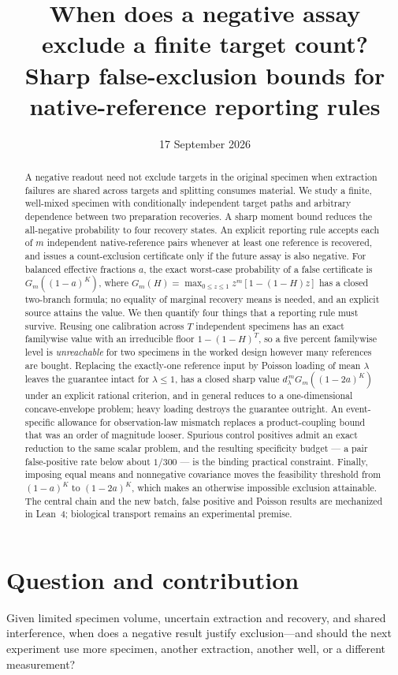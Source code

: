 \documentclass[11pt]{article}
\title{When does a negative assay exclude a finite target count?\\[4pt]
\large Sharp false-exclusion bounds for native-reference reporting rules}
\author{}
\date{17 September 2026}
\theoremstyle{remark}\newtheorem{remark}[theorem]{Remark}
\begin{document}
\maketitle
\vspace{-1.8em}
\begin{abstract}
A negative readout need not exclude targets in the original specimen when
extraction failures are shared across targets and splitting consumes material.
We study a finite, well-mixed specimen with conditionally independent target
paths and arbitrary dependence between two preparation recoveries. A sharp
moment bound reduces the all-negative probability to four recovery states. An
explicit reporting rule accepts each of $m$ independent native-reference pairs
whenever at least one reference is recovered, and issues a count-exclusion
certificate only if the future assay is also negative. For balanced effective
fractions $a$, the exact worst-case probability of a false certificate is
$G_m((1-a)^K)$, where $G_m(H)=\max_{0\le z\le1}z^m[1-(1-H)z]$ has a closed
two-branch formula; no equality of marginal recovery means is needed, and an
explicit source attains the value. We then quantify four things that a reporting
rule must survive. Reusing one calibration across $T$ independent specimens has
an exact familywise value with an irreducible floor $1-(1-H)^T$, so a five
percent familywise level is \emph{unreachable} for two specimens in the worked
design however many references are bought. Replacing the exactly-one reference
input by Poisson loading of mean $\lambda$ leaves the guarantee intact for
$\lambda\le1$, has a closed sharp value $d_\lambda^{\,m}G_m((1-2a)^K)$ under an
explicit rational criterion, and in general reduces to a one-dimensional
concave-envelope problem; heavy loading destroys the guarantee outright. An event-specific
allowance for observation-law mismatch replaces a product-coupling bound that
was an order of magnitude looser. Spurious control positives admit an exact
reduction to the same scalar problem, and the resulting specificity budget --- a
pair false-positive rate below about $1/300$ --- is the binding practical
constraint. Finally, imposing equal means and nonnegative covariance moves the
feasibility threshold from $(1-a)^K$ to $(1-2a)^K$, which makes an otherwise
impossible exclusion attainable. The central chain and the new batch, false
positive and Poisson results are mechanized in Lean~4; biological transport
remains an experimental premise.
\end{abstract}

\section{Question and contribution}\label{sec:intro}
Given limited specimen volume, uncertain extraction and recovery, and shared
interference, when does a negative result justify exclusion---and should the next
experiment use more specimen, another extraction, another well, or a different
measurement?
\end{document}
